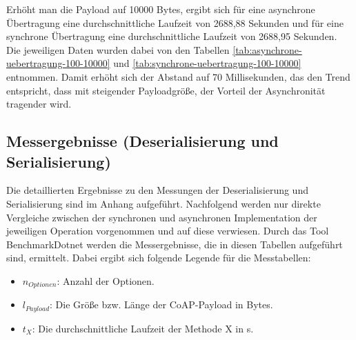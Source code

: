 Erhöht man die Payload auf 10000 Bytes, ergibt sich für eine asynchrone Übertragung eine durchschnittliche Laufzeit von 2688,88 Sekunden und für eine synchrone Übertragung eine durchschnittliche Laufzeit von 2688,95 Sekunden. Die jeweiligen Daten wurden dabei von den Tabellen \ref{tab:asynchrone-uebertragung-100-10000} und \ref{tab:synchrone-uebertragung-100-10000} entnommen. Damit erhöht sich der Abstand auf 70 Millisekunden, das den Trend entspricht, dass mit steigender Payloadgröße, der Vorteil der Asynchronität tragender wird.

\subsection{Messergebnisse (Deserialisierung und Serialisierung)}
\label{subsec:messergebnisse-deserialisierung-serialisierung}

Die detaillierten Ergebnisse zu den Messungen der Deserialisierung und Serialisierung sind im Anhang aufgeführt. Nachfolgend werden nur direkte Vergleiche zwischen der synchronen und asynchronen Implementation der jeweiligen Operation vorgenommen und auf diese verwiesen. Durch das Tool BenchmarkDotnet werden die Messergebnisse, die in diesen Tabellen aufgeführt sind, ermittelt. Dabei ergibt sich folgende Legende für die Messtabellen:
\begin{itemize}
    \item $n_{Optionen}$: Anzahl der Optionen.
    \item $l_{Payload}$: Die Größe bzw. Länge der CoAP-Payload in Bytes.
    \item $t_{X}$: Die durchschnittliche Laufzeit der Methode X in \mu s.
\end{itemize}

